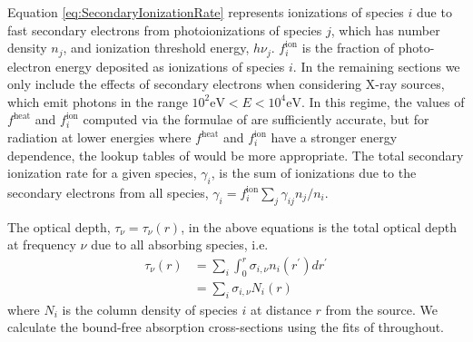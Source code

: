 \documentclass[letterpaper,titlepage,12pt]{article}
\numberwithin{equation}{section}
\newcommand{\ncol}{N_i}
\newcommand{\fheat}{f^{\text{heat}}}
\newcommand{\fion}{f_i^{\text{ion}}}
\begin{document}
Equation \ref{eq:SecondaryIonizationRate} represents ionizations of species
$i$ due to fast secondary electrons from photoionizations of species $j$,
which has number density $n_j$, and ionization threshold energy, $h\nu_j$.
$\fion$ is the fraction of photo-electron energy deposited as ionizations of
species $i$. In the remaining sections we only include the effects of
secondary electrons when considering X-ray sources, which emit photons in the
range $10^2\mathrm{eV} < E < 10^4\mathrm{eV}$. In this regime, the values of
$\fheat$ and $\fion$ computed via the formulae of \citet{Shull1985} are
sufficiently accurate, but for radiation at lower energies where $\fheat$ and
$\fion$ have a stronger energy dependence, the lookup tables of
\citet{Furlanetto2010} would be more appropriate. The total secondary
ionization rate for a given species, $\gamma_i$, is the sum of ionizations due
to the secondary electrons from all species, $\gamma_i = \fion \sum_j
\gamma_{ij} n_j / n_i$.

The optical depth, $\tau_{\nu} = \tau_{\nu}(r)$, in the above equations is
the total optical depth at frequency $\nu$ due to all absorbing species, i.e.
\begin{align}
    \tau_{\nu}(r) & = \sum_i \int_0^r \sigma_{i,\nu} n_i(r^{\prime}) dr^{\prime} \nonumber \\
               & = \sum_i \sigma_{i,\nu} \ncol(r) \label{eq:OpticalDepth}
\end{align}
where $\ncol$ is the column density of species $i$ at distance $r$ from the
source. We calculate the bound-free absorption cross-sections using the fits
of \citet{Verner1996} throughout.
\end{document}
